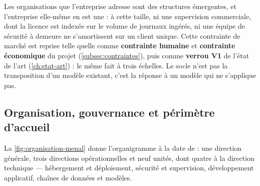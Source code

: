 Les organisations que l'entreprise adresse sont des structures émergentes, et l'entreprise
elle-même en est une : à cette taille, ni une supervision commerciale, dont la licence est
indexée sur le volume de journaux ingérés, ni une équipe de sécurité à demeure ne s'amortissent
sur un client unique. Cette contrainte de marché est reprise telle quelle comme
\textbf{contrainte humaine} et \textbf{contrainte économique} du projet
(\cref{subsec:contraintes}), puis comme \textbf{verrou V1} de l'état de l'art
(\cref{ch:etat-art}) : le même fait à trois échelles. Le socle n'est pas la transposition d'un
modèle existant, c'est la réponse à un modèle qui ne s'applique pas.

\subsection{Organisation, gouvernance et périmètre d'accueil}
\label{subsec:service-accueil}

La \cref{fig:organisation-menal} donne l'organigramme à la date de \dateref : une direction
générale, trois directions opérationnelles et neuf unités, dont quatre à la direction technique
--- hébergement et déploiement, sécurité et supervision, développement applicatif, chaînes de
données et modèles.

